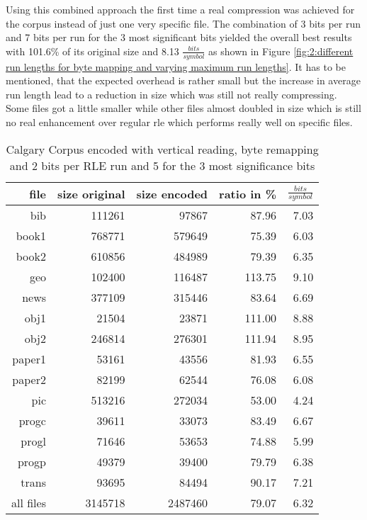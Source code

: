 \par{
Using this combined approach the first time a real compression was achieved for the corpus instead of just one very specific file. The combination of 3 bits per run and 7 bits per run for the 3 most significant bits yielded the overall best results with 101.6\% of its original size and 8.13 $\frac{bits}{symbol}$ as shown in Figure \ref{fig:2:different run lengths for byte mapping and varying maximum run lengths}. It has to be mentioned, that the expected overhead is rather small but the increase in average run length lead to a reduction in size which was still not really compressing. Some files got a little smaller while other files almost doubled in size which is still no real enhancement over regular rle which performs really well on specific files.
\begin{table}[H]
	\centering
	\begin{tabular}{r|r|r|r|r}	
		file & size original & size encoded & ratio in \% & $\frac{bits}{symbol}$\\
		\hline
		bib & 111261 & 97867 & 87.96 & 7.03\\
		book1 & 768771 & 579649 & 75.39 & 6.03 \\
		book2 & 610856 & 484989 & 79.39 & 6.35\\
		geo & 102400 & 116487 & 113.75 & 9.10\\
		news & 377109 & 315446 & 83.64 & 6.69\\
		obj1 & 21504 & 23871 & 111.00 & 8.88\\
		obj2& 246814 & 276301 & 111.94 & 8.95\\		 
		paper1 & 53161 & 43556 & 81.93 & 6.55\\		 
		paper2& 82199 & 62544 & 76.08 & 6.08\\		 
		pic & 513216 & 272034 & 53.00 & 4.24\\		 
		progc & 39611 & 33073 & 83.49 & 6.67\\		 
		progl & 71646 & 53653 & 74.88 & 5.99\\		 
		progp & 49379 & 39400 & 79.79 & 6.38\\		 
		trans & 93695 & 84494 & 90.17 & 7.21\\
		\hline
		all files & 3145718 & 2487460 & 79.07 & 6.32
	\end{tabular}
	\caption{Calgary Corpus encoded with vertical reading, byte remapping and 2 bits per RLE run and 5 for the 3 most significance bits}
\label{tab:t43 Calgary Corpus encoded with vertical reading, byte remapping and 2 bits per RLE run and 5 for the 3 most significance bits}
\end{table}
}

